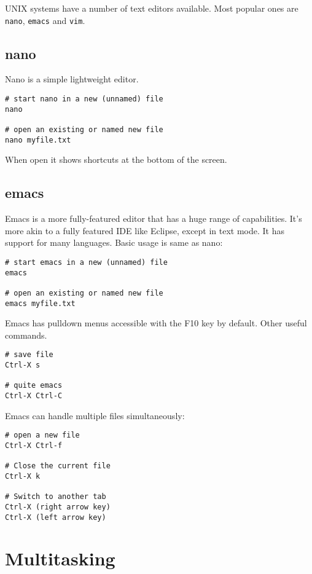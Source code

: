 UNIX systems have a number of text editors available.
Most popular ones are \texttt{nano}, \texttt{emacs} and \texttt{vim}.

\subsection{nano}

Nano is a simple lightweight editor.

\begin{verbatim}
# start nano in a new (unnamed) file
nano

# open an existing or named new file
nano myfile.txt
\end{verbatim}

When open it shows shortcuts at the bottom of the screen.

\subsection{emacs}

Emacs is a more fully-featured editor that has a huge range of capabilities.
It's more akin to a fully featured IDE like Eclipse, except in text mode.
It has support for many languages.
Basic usage is same as nano:

\begin{verbatim}
# start emacs in a new (unnamed) file
emacs

# open an existing or named new file
emacs myfile.txt
\end{verbatim}

Emacs has pulldown menus accessible with the F10 key by default.
Other useful commands.

\begin{verbatim}
# save file
Ctrl-X s

# quite emacs
Ctrl-X Ctrl-C
\end{verbatim}

Emacs can handle multiple files simultaneously:

\begin{verbatim}
# open a new file
Ctrl-X Ctrl-f

# Close the current file
Ctrl-X k

# Switch to another tab
Ctrl-X (right arrow key)
Ctrl-X (left arrow key)
\end{verbatim}

\section{Multitasking}

